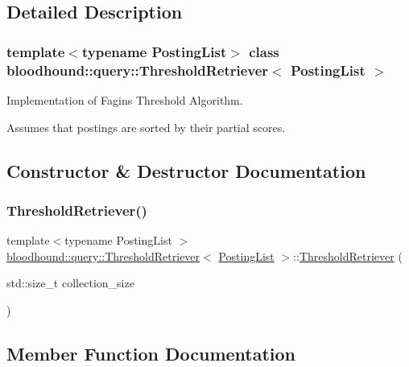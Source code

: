 \subsection{Detailed Description}
\subsubsection*{template$<$typename Posting\+List$>$\newline
class bloodhound\+::query\+::\+Threshold\+Retriever$<$ Posting\+List $>$}

Implementation of Fagin\textquotesingle{}s Threshold Algorithm.

Assumes that postings are sorted by their partial scores. 

\subsection{Constructor \& Destructor Documentation}
\mbox{\label{classbloodhound_1_1query_1_1ThresholdRetriever_a425d17d048e1fd3fd8157450c99df5bc}} 
\subsubsection{\texorpdfstring{Threshold\+Retriever()}{ThresholdRetriever()}}
{\footnotesize\ttfamily template$<$typename Posting\+List $>$ \\
\hyperlink{classbloodhound_1_1query_1_1ThresholdRetriever}{bloodhound\+::query\+::\+Threshold\+Retriever}$<$ \hyperlink{classbloodhound_1_1PostingList}{Posting\+List} $>$\+::\hyperlink{classbloodhound_1_1query_1_1ThresholdRetriever}{Threshold\+Retriever} (\begin{DoxyParamCaption}\item[{std\+::size\+\_\+t}]{collection\+\_\+size }\end{DoxyParamCaption})\hspace{0.3cm}{\ttfamily [inline]}}



\subsection{Member Function Documentation}
\mbox{\label{classbloodhound_1_1query_1_1ThresholdRetriever_a06750450e1246e755ebad2d5dac6e8a8}} 
